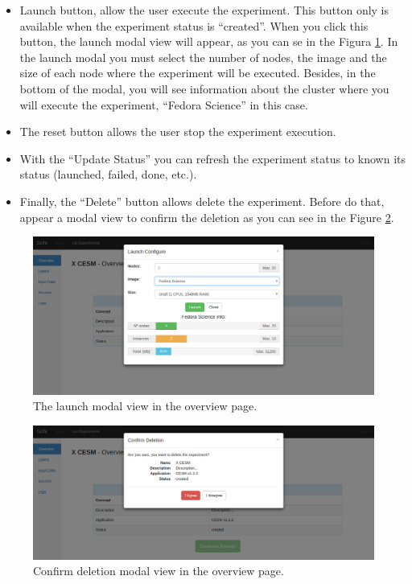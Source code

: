 \documentclass[11pt]{article}
\begin{document}
\begin{itemize}
	\item Launch button, allow the user execute the experiment. This button only is available when the experiment status is ``created''. When you click this button, the launch modal view will appear, as you can se in the Figura \ref{fig:overview-launch}. In the launch modal you must select the number of nodes, the image and the size of each node where the experiment will be executed. Besides, in the bottom of the modal, you will see information about the cluster where you will execute the experiment, ``Fedora Science'' in this case.
	\item The reset button allows the user stop the experiment execution.
	\item With the ``Update Status'' you can refresh the experiment status to known its status (launched, failed, done, etc.).
	\item Finally, the ``Delete'' button allows delete the experiment. Before do that, appear a modal view to confirm the deletion as you can see in the Figure \ref{fig:overview-delete}.
\end{itemize}

\begin{figure}[htp]
	\centering
	\includegraphics[width=\linewidth]{img/overview-launch}
	\caption{The launch modal view in the overview page.}
	\label{fig:overview-launch}
\end{figure}
\begin{figure}[htp]
	\centering
	\includegraphics[width=\linewidth]{img/overview-delete}
	\caption{Confirm deletion modal view in the overview page.}
	\label{fig:overview-delete}
\end{figure}
\end{document}

